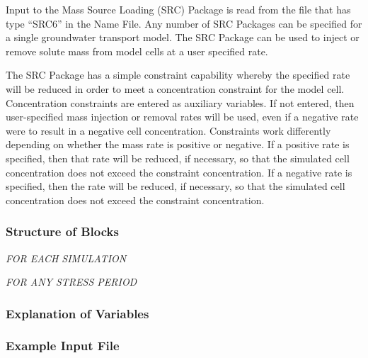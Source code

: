 Input to the Mass Source Loading (SRC) Package is read from the file that has type ``SRC6'' in the Name File.  Any number of SRC Packages can be specified for a single groundwater transport model.  The SRC Package can be used to inject or remove solute mass from model cells at a user specified rate.  

The SRC Package has a simple constraint capability whereby the specified rate will be reduced in order to meet a concentration constraint for the model cell.  Concentration constraints are entered as auxiliary variables.  If not entered, then user-specified mass injection or removal rates will be used, even if a negative rate were to result in a negative cell concentration.  Constraints work differently depending on whether the mass rate is positive or negative.  If a positive rate is specified, then that rate will be reduced, if necessary, so that the simulated cell concentration does not exceed the constraint concentration.  If a negative rate is specified, then the rate will be reduced, if necessary, so that the simulated cell concentration does not exceed the constraint concentration.  

\vspace{5mm}
\subsubsection{Structure of Blocks}
\vspace{5mm}

\noindent \textit{FOR EACH SIMULATION}


\vspace{5mm}
\noindent \textit{FOR ANY STRESS PERIOD}

\packageperioddescription

\vspace{5mm}
\subsubsection{Explanation of Variables}
\begin{description}

\end{description}

\vspace{5mm}
\subsubsection{Example Input File}


